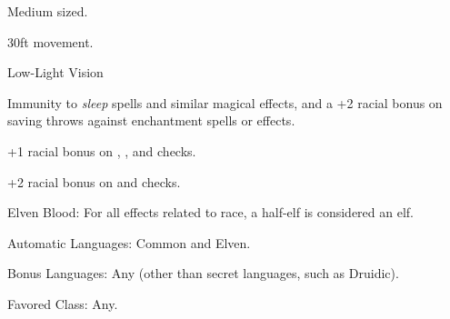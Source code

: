 

\begin{itemize*}
\item Medium sized.
\item 30ft movement.
\item Low-Light Vision
\item Immunity to \textit{sleep} spells and similar magical effects, and a +2 racial bonus on saving throws against enchantment spells or effects.
\item +1 racial bonus on , , and  checks.
\item +2 racial bonus on  and  checks.
\item Elven Blood: For all effects related to race, a half-elf is considered an elf.
\item Automatic Languages: Common and Elven.
\item Bonus Languages: Any (other than secret languages, such as Druidic).
\item Favored Class: Any.
\end{itemize*}
